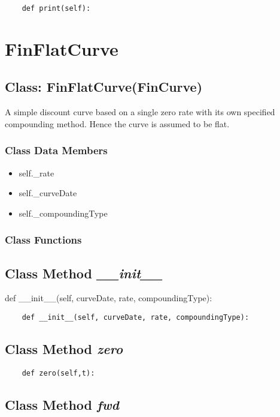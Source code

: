 \documentclass[twoside,11pt]{book}
\begin{document}
\begin{lstlisting}
    def print(self):
\end{lstlisting}

\newpage
\section{FinFlatCurve}

\subsection{Class: FinFlatCurve(FinCurve)}
A simple discount curve based on a single zero rate with its own specified compounding method. Hence the curve is assumed to be flat. 

\subsubsection{Class Data Members}
\begin{itemize}
\item{self.\_rate}
\item{self.\_curveDate}
\item{self.\_compoundingType}
\end{itemize}

\subsubsection{Class Functions}

\subsection{Class Method {\it \_\_init\_\_}}
def \_\_init\_\_(self, curveDate, rate, compoundingType):

\begin{lstlisting}
    def __init__(self, curveDate, rate, compoundingType):
\end{lstlisting}

\subsection{Class Method {\it zero}}


\begin{lstlisting}
    def zero(self,t):
\end{lstlisting}

\subsection{Class Method {\it fwd}}
\end{document}
